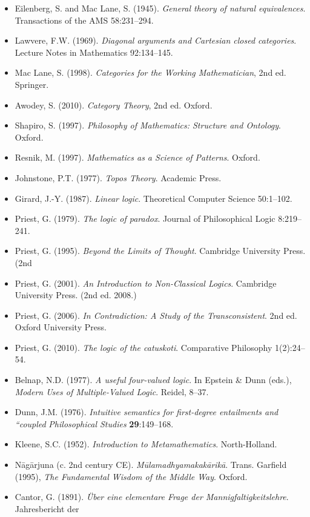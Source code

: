 \documentclass[12pt,a4paper]{article}
\begin{document}
\begin{itemize}
 \item Eilenberg, S. and Mac Lane, S. (1945). \emph{General theory of natural equivalences}. Transactions of the AMS 58:231--294.
 \item Lawvere, F.W. (1969). \emph{Diagonal arguments and Cartesian closed categories}. Lecture Notes in Mathematics 92:134--145.
 \item Mac Lane, S. (1998). \emph{Categories for the Working Mathematician}, 2nd ed. Springer.
 \item Awodey, S. (2010). \emph{Category Theory}, 2nd ed. Oxford.
 \item Shapiro, S. (1997). \emph{Philosophy of Mathematics: Structure and Ontology}. Oxford.
 \item Resnik, M. (1997). \emph{Mathematics as a Science of Patterns}. Oxford.
 \item Johnstone, P.T. (1977). \emph{Topos Theory}. Academic Press.
 \item Girard, J.-Y. (1987). \emph{Linear logic}. Theoretical Computer Science 50:1--102.
 \item Priest, G. (1979). \emph{The logic of paradox}. Journal of Philosophical Logic 8:219--241.
 \item Priest, G. (1995). \emph{Beyond the Limits of Thought}. Cambridge University Press. (2nd
 \item Priest, G. (2001). \emph{An Introduction to Non-Classical Logics}. Cambridge University Press. (2nd ed. 2008.)
 \item Priest, G. (2006). \emph{In Contradiction: A Study of the Transconsistent}. 2nd ed. Oxford University Press.
 \item Priest, G. (2010). \emph{The logic of the catuskoti}. Comparative Philosophy 1(2):24--54.
 \item Belnap, N.D. (1977). \emph{A useful four-valued logic}. In Epstein \& Dunn (eds.),
 \emph{Modern Uses of Multiple-Valued Logic}. Reidel, 8--37.
 \item Dunn, J.M. (1976). \emph{Intuitive semantics for first-degree entailments and ``coupled} \emph{Philosophical Studies} \textbf{29}:149--168.
 \item Kleene, S.C. (1952). \emph{Introduction to Metamathematics}. North-Holland.
 \item N\={a}g\={a}rjuna (c. 2nd century CE). \emph{M\={u}lamadhyamakak\={a}rik\={a}}. Trans. Garfield (1995),
\emph{The Fundamental Wisdom of the Middle Way}. Oxford.
 \item Cantor, G. (1891). \emph{\"Uber eine elementare Frage der Mannigfaltigkeitslehre}. Jahresbericht der

\end{itemize}
\end{document}
